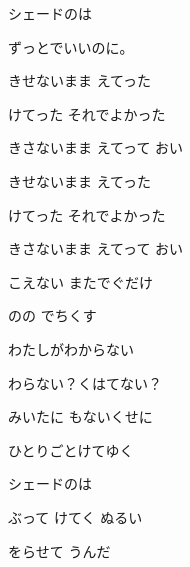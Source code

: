 \documentclass[a4paper,tate,twocolumn,12pt]{ltjtarticle}
\begin{document}
\thispagestyle{empty}

\begin{center}
{\LARGE シェードのは}

{\large ずっとでいいのに。}
\end{center}

\vspace{1em}

\begin{flushleft}

\noindent\begin{minipage}{\linewidth}
きせないまま えてった

けてった それでよかった

きさないまま えてって おい

きせないまま えてった

けてった それでよかった

きさないまま えてって おい
\end{minipage}

\vspace{2em}

\noindent\begin{minipage}{\linewidth}
こえない またでぐだけ

のの でちくす

わたしがわからない

わらない？くはてない？

みいたに もないくせに

ひとりごとけてゆく

シェードのは
\end{minipage}

\vspace{2em}

\noindent\begin{minipage}{\linewidth}
ぶって けてく ぬるい

をらせて うんだ 


\end{minipage}
\end{flushleft}
\end{document}
